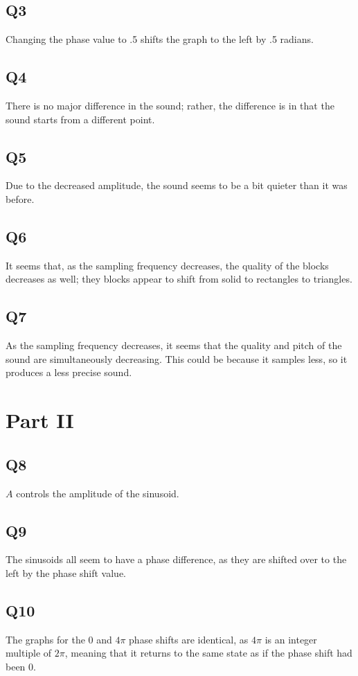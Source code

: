 \documentclass[
	letterpaper, %
	10pt, %
]{CSUniSchoolLabReport}
\begin{document}
\subsection{Q3} Changing the phase value to .5 shifts the graph to the left by .5 radians.

\subsection{Q4} There is no major difference in the sound; rather, the difference is in that the sound starts from a different point.

\subsection{Q5} Due to the decreased amplitude, the sound seems to be a bit quieter than it was before.

\subsection{Q6} It seems that, as the sampling frequency decreases, the quality of the blocks decreases as well; they blocks appear to shift from solid to rectangles to triangles.

\subsection{Q7} As the sampling frequency decreases, it seems that the quality and pitch of the sound are simultaneously decreasing. This could be because it samples less, so it produces a less precise sound.

\section{Part II}

\subsection{Q8} $A$ controls the amplitude of the sinusoid.

\subsection{Q9} The sinusoids all seem to have a phase difference, as they are shifted over to the left by the phase shift value.

\subsection{Q10} The graphs for the 0 and $4\pi$ phase shifts are identical, as $4\pi$ is an integer multiple of $2\pi$, meaning that it returns to the same state as if the phase shift had been 0.
\end{document}
